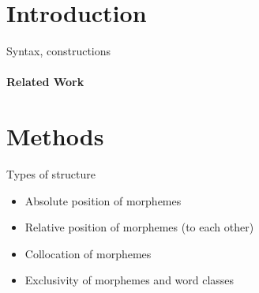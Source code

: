 \section{Introduction}

Syntax, constructions

\paragraph{Related Work}

\section{Methods}

Types of structure
\begin{itemize}
  \item Absolute position of morphemes
  \item Relative position of morphemes (to each other)
  \item Collocation of morphemes
  \item Exclusivity of morphemes and word classes
\end{itemize}
